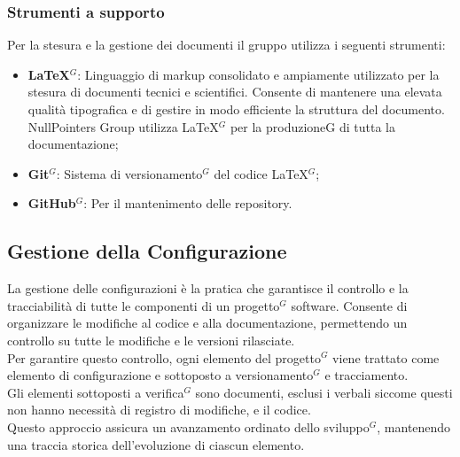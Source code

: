 \subsubsection{Strumenti a supporto}
	Per la stesura e la gestione dei documenti il gruppo utilizza i seguenti strumenti: \vspace{-0.5em}
	\begin{itemize}[itemsep=3pt, parsep=1pt, label=$\scriptstyle\bullet$]
	    \item \textbf{LaTeX$^G$}: Linguaggio di markup consolidato e ampiamente utilizzato per la stesura di documenti tecnici e scientifici. Consente di mantenere una elevata qualità tipografica e di gestire in modo efficiente la struttura del documento. NullPointers Group utilizza LaTeX$^G$ per la produzioneG di tutta la documentazione;
	    \item \textbf{Git$^G$}: Sistema di versionamento$^G$ del codice LaTeX$^G$;
	    \item \textbf{GitHub$^G$}: Per il mantenimento delle repository. 
	\end{itemize}

\subsection{Gestione della Configurazione}
\label{sec:gestione-configurazione}
La gestione delle configurazioni è la pratica che garantisce il controllo e la tracciabilità di tutte le componenti di un progetto$^G$ software. Consente di organizzare le modifiche al codice e alla documentazione, permettendo un controllo su tutte le modifiche e le versioni rilasciate.\\
Per garantire questo controllo, ogni elemento del progetto$^G$ viene trattato come elemento di configurazione e sottoposto a versionamento$^G$ e tracciamento.\\
Gli elementi sottoposti a verifica$^G$ sono documenti, esclusi i verbali siccome questi non hanno necessità di registro di modifiche, e il codice.\\
Questo approccio assicura un avanzamento ordinato dello sviluppo$^G$, mantenendo una traccia storica dell’evoluzione di ciascun elemento.

\label{sec:ticketing}

